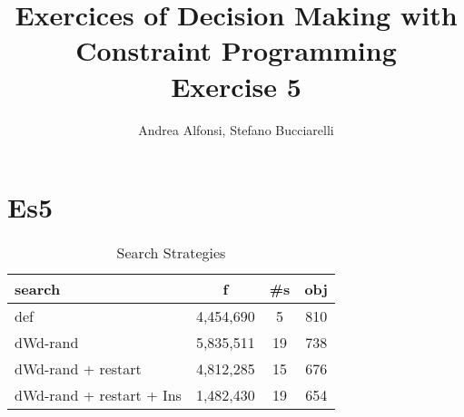 \documentclass{article}
\title{Exercices of Decision Making with Constraint Programming\\  Exercise 5}
\author{Andrea Alfonsi, Stefano Bucciarelli}
\begin{document}
\maketitle

\section{Es5}
    \begin{table}[h]
    \centering
    \begin{tabular}{|l|c|c|c|}
        \hline
        \textbf{search} & \textbf{f} & \textbf{\#s} & \textbf{obj} \\ \hline
        def & 4,454,690 & 5 & 810 \\ \hline
        dWd-rand & 5,835,511 & 19 & 738 \\ \hline
        dWd-rand + restart & 4,812,285 & 15 & 676 \\ \hline
        dWd-rand + restart + Ins & 1,482,430 & 19 & 654 \\ \hline
    \end{tabular}
    \caption{Search Strategies}
    \label{tab:search_strategies}
\end{table}
\end{document}
